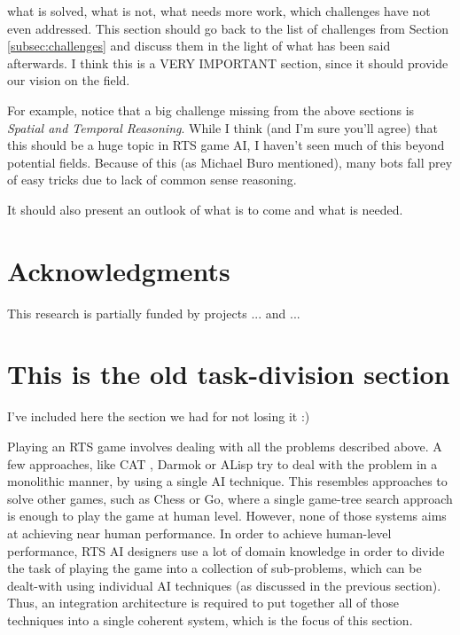 \documentclass[journal]{IEEEtran}
\begin{document}
{\color{blue}	
what is solved, what is not, what needs more work, which challenges have not even addressed. This section should go back to the list of challenges from Section \ref{subsec:challenges} and discuss them in the light of what has been said afterwards. I think this is a VERY IMPORTANT section, since it should provide our vision on the field.

For example, notice that a big challenge missing from the above sections is {\em Spatial and Temporal Reasoning}. While I think (and I'm sure you'll agree) that this should be a huge topic in RTS game AI, I haven't seen much of this beyond potential fields. Because of this (as Michael Buro mentioned), many bots fall prey of easy tricks due to lack of common sense reasoning.

It should also present an outlook of what is to come and what is needed.
}


\section*{Acknowledgments} {\color{blue} This research is partially funded by projects ... and ... }


\appendix

\section*{This is the old task-division section}

{\color{red}
I've included here the section we had for not losing it :)
}


Playing an RTS game involves dealing with all the problems described above. A few approaches, like CAT \cite{LTW}, Darmok \cite{OntanonMSR10} or ALisp \cite{Marthi05} try to deal with the problem in a monolithic manner, by using a single AI technique. This resembles approaches to solve other games, such as Chess or Go, where a single game-tree search approach is enough to play the game at human level. However, none of those systems aims at achieving near human performance. In order to achieve human-level performance, RTS AI designers use a lot of domain knowledge in order to divide the task of playing the game into a collection of sub-problems, which can be dealt-with using individual AI techniques (as discussed in the previous section). Thus, an integration architecture is required to put together all of those techniques into a single coherent system, which is the focus of this section.
\end{document}
